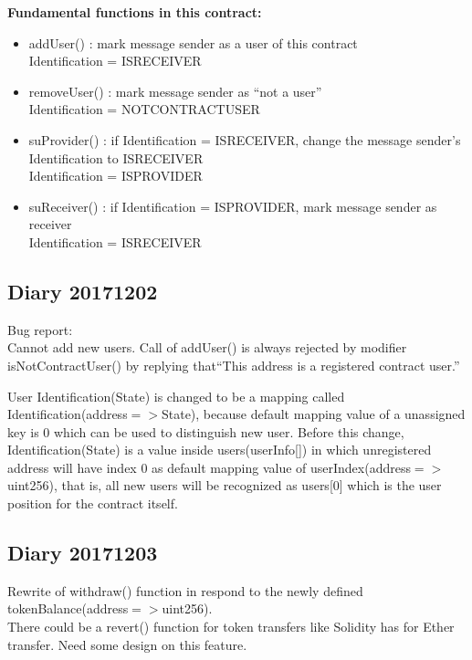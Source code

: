 \textbf{Fundamental functions in this contract:}
\begin{itemize}
    \item addUser() : mark message sender as a user of this contract\\
    Identification = ISRECEIVER
    \item removeUser() : mark message sender as ``not a user''\\
    Identification = NOTCONTRACTUSER
    \item suProvider() : if Identification = ISRECEIVER, change the message sender's Identification to ISRECEIVER\\
    Identification = ISPROVIDER
    \item suReceiver() : if Identification = ISPROVIDER, mark message sender as receiver\\
    Identification = ISRECEIVER
\end{itemize}
\subsection{Diary 20171202}
Bug report:\\
Cannot add new users. Call of addUser() is always rejected by modifier isNotContractUser() by 
replying that``This address is a registered contract user.''

User Identification(State) is changed to be a mapping called Identification(address$=>$State),
because default mapping value of a unassigned key is 0 which can be used to distinguish new user.
Before this change, Identification(State) is a value inside users(userInfo[]) in which
unregistered address will have index 0 as default mapping value of userIndex(address$=>$uint256),
that is, all new users will be recognized as users[0] which is the user position for the contract itself.
\subsection{Diary 20171203}
Rewrite of withdraw() function in respond to the newly defined tokenBalance(address$=>$uint256).\\
There could be a revert() function for token transfers like Solidity has for Ether transfer.
Need some design on this feature.
%



